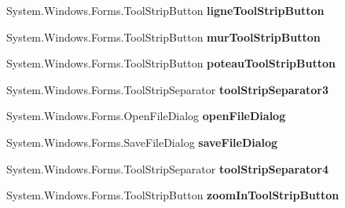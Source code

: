 \begin{DoxyCompactItemize}
\item 
System.\+Windows.\+Forms.\+Tool\+Strip\+Button {\bfseries ligne\+Tool\+Strip\+Button}\hypertarget{class_interface_graphique_1_1_edition_adc9aeb99481d33397e881e618adb8685}{}\label{class_interface_graphique_1_1_edition_adc9aeb99481d33397e881e618adb8685}

\item 
System.\+Windows.\+Forms.\+Tool\+Strip\+Button {\bfseries mur\+Tool\+Strip\+Button}\hypertarget{class_interface_graphique_1_1_edition_a2f3e064ba0701e4fb9ce4772625b3aad}{}\label{class_interface_graphique_1_1_edition_a2f3e064ba0701e4fb9ce4772625b3aad}

\item 
System.\+Windows.\+Forms.\+Tool\+Strip\+Button {\bfseries poteau\+Tool\+Strip\+Button}\hypertarget{class_interface_graphique_1_1_edition_a19a1625818b45c8d1f1a79566656f8a1}{}\label{class_interface_graphique_1_1_edition_a19a1625818b45c8d1f1a79566656f8a1}

\item 
System.\+Windows.\+Forms.\+Tool\+Strip\+Separator {\bfseries tool\+Strip\+Separator3}\hypertarget{class_interface_graphique_1_1_edition_a33690d034c1b4979ba90e1c922df0b3f}{}\label{class_interface_graphique_1_1_edition_a33690d034c1b4979ba90e1c922df0b3f}

\item 
System.\+Windows.\+Forms.\+Open\+File\+Dialog {\bfseries open\+File\+Dialog}\hypertarget{class_interface_graphique_1_1_edition_a5924618aa449acab2c9817a9520f908e}{}\label{class_interface_graphique_1_1_edition_a5924618aa449acab2c9817a9520f908e}

\item 
System.\+Windows.\+Forms.\+Save\+File\+Dialog {\bfseries save\+File\+Dialog}\hypertarget{class_interface_graphique_1_1_edition_a79658510db471ccbf5e837504bbd87bb}{}\label{class_interface_graphique_1_1_edition_a79658510db471ccbf5e837504bbd87bb}

\item 
System.\+Windows.\+Forms.\+Tool\+Strip\+Separator {\bfseries tool\+Strip\+Separator4}\hypertarget{class_interface_graphique_1_1_edition_a699e770cc2c3da4fad0fdc955941d883}{}\label{class_interface_graphique_1_1_edition_a699e770cc2c3da4fad0fdc955941d883}

\item 
System.\+Windows.\+Forms.\+Tool\+Strip\+Button {\bfseries zoom\+In\+Tool\+Strip\+Button}\hypertarget{class_interface_graphique_1_1_edition_a9de8c72e8b528e3bfd8999f49ef9a511}{}\label{class_interface_graphique_1_1_edition_a9de8c72e8b528e3bfd8999f49ef9a511}


\end{DoxyCompactItemize}

